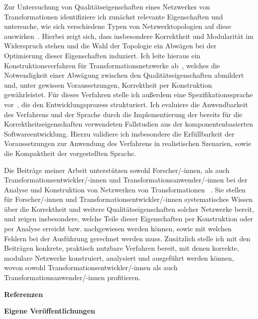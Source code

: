 \documentclass[a4paper,deutsch,CS,11pt,unnummeriert]{KITbrief}
\newcommand\owncite[2][]{%
    \cite[#1]{#2}%
    \addtocategory{ownpublications}{#2}%
}
\begin{document}
Zur Untersuchung von Qualitätseigenschaften eines Netzwerkes von Transformationen identifiziere ich zunächst relevante Eigenschaften und untersuche, wie sich verschiedene Typen von Netzwerktopologien auf diese auswirken~\cite{klare2018docsym}.
Hierbei zeigt sich, dass insbesondere Korrektheit und Modularität im Widerspruch stehen und die Wahl der Topologie ein Abwägen bei der Optimierung dieser Eigenschaften induziert.
Ich leite hieraus ein Konstruktionsverfahren für Transformationsnetzwerke ab~\cite{klare2019models}, welches die Notwendigkeit einer Abwägung zwischen den Qualitätseigenschaften abmildert und, unter gewissen Voraussetzungen, Korrektheit per Konstruktion gewährleistet. %
Für dieses Verfahren stelle ich außerdem eine Spezifikationssprache vor~\cite{klare2019models}, die den Entwicklungsprozess strukturiert.
Ich evaluiere die Anwendbarkeit des Verfahrens und der Sprache durch die Implementierung der bereits für die Korrektheitseigenschaften verwendeten Fallstudien aus der komponentenbasierten Softwareentwicklung. 
Hierzu validiere ich insbesondere die Erfüllbarkeit der Voraussetzungen zur Anwendung des Verfahrens in realistischen Szenarien, sowie die Kompaktheit der vorgestellten Sprache.

Die Beiträge meiner Arbeit unterstützen sowohl Forscher/-innen, als auch Transformationsentwickler/-innen und Transformationsanwender/-innen bei der Analyse und Konstruktion von Netzwerken von Transformationen~\owncite{klare2019dagstuhl}.
Sie stellen für Forscher/-innen und Transformationsentwickler/-innen systematisches Wissen über die Korrektheit und weitere Qualitätseigenschaften solcher Netzwerke bereit, und zeigen insbesondere, welche Teile dieser Eigenschaften per Konstruktion oder per Analyse erreicht bzw. nachgewiesen werden können, sowie mit welchen Fehlern bei der Ausführung gerechnet werden muss.
Zusätzlich stelle ich mit den Beiträgen konkrete, praktisch nutzbare Verfahren bereit, mit denen korrekte, modulare Netzwerke konstruiert, analysiert und ausgeführt werden können, wovon sowohl Transformationsentwickler/-innen als auch Transformationsanwender/-innen profitieren.

\clearpage
\textbf{Referenzen}
\setlength\bibitemsep{0.8ex} %
\printbibliography[title={Referenzen},heading=none,notcategory=ownpublications]

\textbf{Eigene Veröffentlichungen}
\printbibliography[title={Eigene Veröffentlichungen},heading=none,category=ownpublications]
\end{document}

